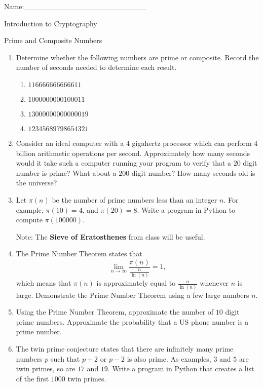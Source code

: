 \documentclass[12pt]{amsart}
\theoremstyle{definition}
\theoremstyle{remark}
\numberwithin{equation}{section}
\begin{document}
\begin{flushright}
Name:\_\_\_\_\_\_\_\_\_\_\_\_\_\_\_\_\_\_\_\_\_\_\_
\end{flushright}
\vspace{10pt}
\begin{center}
Introduction to Cryptography

Prime and Composite Numbers
\end{center}

\begin{enumerate}

\item Determine whether the following numbers are prime or composite. Record the number of seconds needed to determine each result.
\begin{enumerate}
\item $116666666666611$
\item $1000000000100011$
\item $13000000000000019$
\item $12345689798654321$
\end{enumerate}

\item Consider an ideal computer with a $4$ gigahertz processor which can perform $4$ billion arithmetic operations per second. Approximately how many seconds would it take such a computer running your program to verify that a $20$ digit number is prime? What about a $200$ digit number? How many seconds old is the universe?

\item Let $\pi(n)$ be the number of prime numbers less than an integer $n$. For example, $\pi(10)=4$, and $\pi(20)=8$. Write a program in Python to compute $\pi(100000)$. 

Note: The {\bf Sieve of Eratosthenes} from class will be useful.

\item The Prime Number Theorem states that $$\lim_{n\rightarrow\infty}\frac{\pi(n)}{\frac{n}{\ln(n)}}=1,$$ which means that $\pi(n)$ is approximately equal to $\frac{n}{\ln(n)}$ whenever $n$ is large. Demonstrate the Prime Number Theorem using a few large numbers $n$.

\item Using the Prime Number Theorem, approximate the number of $10$ digit prime numbers. Approximate the probability that a US phone number is a prime number.

\item The twin prime conjecture states that there are infinitely many prime numbers $p$ such that $p+2$ or $p-2$ is also prime. As examples, $3$ and $5$ are twin primes, so are $17$ and $19$. Write a program in Python that creates a list of the first $1000$ twin primes.
\end{enumerate}
\end{document}
